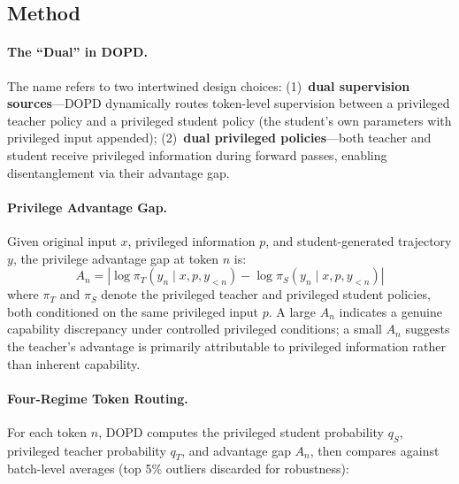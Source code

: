 \documentclass[11pt,a4paper]{article}
\begin{document}
\subsection{Method}

\paragraph{The ``Dual'' in DOPD.} The name refers to two intertwined design choices: (1)~\textbf{dual supervision sources}---DOPD dynamically routes token-level supervision between a privileged teacher policy and a privileged student policy (the student's own parameters with privileged input appended); (2)~\textbf{dual privileged policies}---both teacher and student receive privileged information during forward passes, enabling disentanglement via their advantage gap.

\paragraph{Privilege Advantage Gap.} Given original input $x$, privileged information $p$, and student-generated trajectory $y$, the privilege advantage gap at token $n$ is:
\begin{equation}
A_n = \left|\log \pi_T(y_n \mid x, p, y_{<n}) - \log \pi_S(y_n \mid x, p, y_{<n})\right|
\end{equation}
where $\pi_T$ and $\pi_S$ denote the privileged teacher and privileged student policies, both conditioned on the same privileged input $p$. A large $A_n$ indicates a genuine capability discrepancy under controlled privileged conditions; a small $A_n$ suggests the teacher's advantage is primarily attributable to privileged information rather than inherent capability.

\paragraph{Four-Regime Token Routing.} For each token $n$, DOPD computes the privileged student probability $q_S$, privileged teacher probability $q_T$, and advantage gap $A_n$, then compares against batch-level averages (top 5\% outliers discarded for robustness):
\end{document}
